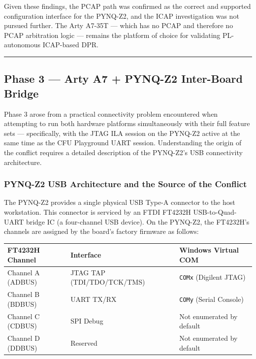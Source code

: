 Given these findings, the PCAP path was confirmed as the correct and supported configuration interface for the PYNQ-Z2, and the ICAP investigation was not pursued further. The Arty A7-35T — which has no PCAP and therefore no PCAP arbitration logic — remains the platform of choice for validating PL-autonomous ICAP-based DPR.

\vspace{0.4em}\hrule\vspace{0.4em}

\subsection{Phase 3 — Arty A7 + PYNQ-Z2 Inter-Board Bridge}

Phase 3 arose from a practical connectivity problem encountered when attempting to run both hardware platforms simultaneously with their full feature sets — specifically, with the JTAG ILA session on the PYNQ-Z2 active at the same time as the CFU Playground UART session. Understanding the origin of the conflict requires a detailed description of the PYNQ-Z2's USB connectivity architecture.

\subsubsection{PYNQ-Z2 USB Architecture and the Source of the Conflict}

The PYNQ-Z2 provides a single physical USB Type-A connector to the host workstation. This connector is serviced by an FTDI FT4232H USB-to-Quad-UART bridge IC (a four-channel USB device). On the PYNQ-Z2, the FT4232H's channels are assigned by the board's factory firmware as follows:

\begin{table}[htbp]
\centering
\begin{tabular}{lll}
\toprule
FT4232H Channel & Interface & Windows Virtual COM \\
\midrule
Channel A (ADBUS) & JTAG TAP (TDI/TDO/TCK/TMS) & \texttt{COMx} (Digilent JTAG) \\
Channel B (BDBUS) & UART TX/RX & \texttt{COMy} (Serial Console) \\
Channel C (CDBUS) & SPI Debug & Not enumerated by default \\
Channel D (DDBUS) & Reserved & Not enumerated by default \\
\bottomrule
\end{tabular}
\end{table}

